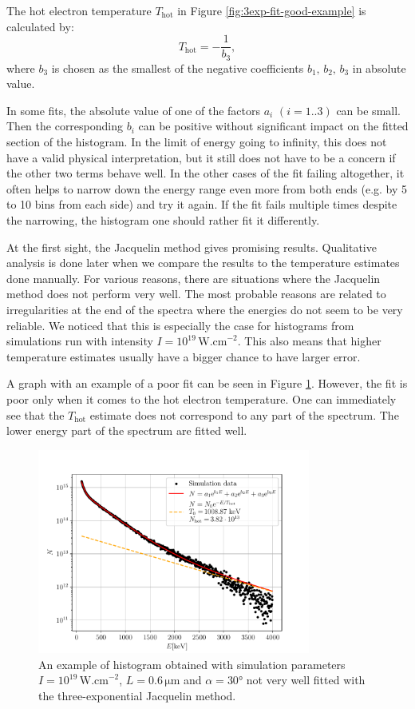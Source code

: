 The hot electron temperature $T_\mathrm{hot}$ in Figure \ref{fig:3exp-fit-good-example} is calculated by:
\begin{equation}
	\label{eq:t-hot-from-b}
	T_{\mathrm{hot}} = -\frac{1}{b_3},
\end{equation}
where $b_3$ is chosen as the smallest of the negative coefficients $b_1,\, b_2,\, b_3$ in absolute value. 

In some fits, the absolute value of one of the factors $a_i$ $(i=1..3)$ can be small. Then the corresponding $b_i$ can be positive without significant impact on the fitted section of the histogram. In the limit of energy going to infinity, this does not have a valid physical interpretation, but it still does not have to be a concern if the other two terms behave well. In the other cases of the fit failing altogether, it often helps to narrow down the energy range even more from both ends (e.g. by 5 to 10 bins from each side) and try it again. If the fit fails multiple times despite the narrowing, the histogram one should rather fit it differently.

At the first sight, the Jacquelin method gives promising results. Qualitative analysis is done later when we compare the results to the temperature estimates done manually. For various reasons, there are situations where the Jacquelin method does not perform very well. The most probable reasons are related to irregularities at the end of the spectra where the energies do not seem to be very reliable. We noticed that this is especially the case for histograms from simulations run with intensity $I=10^{19}\,\mathrm{W.cm}^{-2}$. This also means that higher temperature estimates usually have a bigger chance to have larger error.

A graph with an example of a poor fit can be seen in Figure \ref{fig:3exp-ex-bad}. However, the fit is poor only when it comes to the hot electron temperature. One can immediately see that the $T_\mathrm{hot}$ estimate does not correspond to any part of the spectrum. The lower energy part of the spectrum are fitted well.
\begin{figure}[ht]
	\centering
		\includegraphics[width=0.8\textwidth]{figures/3exp-ex-bad}
		\caption{An example of histogram obtained with simulation parameters $I=10^{19}\,\mathrm{W.cm}^{-2}$, $L=0.6\,\mathrm{\mu m}$ and $\alpha = 30$° not very well fitted with the three-exponential Jacquelin method.}
		\label{fig:3exp-ex-bad}
\end{figure}

